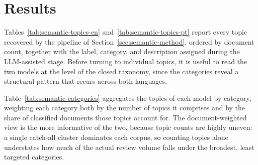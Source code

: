 
\section{Results}
\label{sec:semantic-results}

Tables~\ref{tab:semantic-topics-en} and~\ref{tab:semantic-topics-pt} report every topic recovered by the pipeline of Section~\ref{sec:semantic-method}, ordered by document count, together with the label, category, and description assigned during the LLM-assisted stage. Before turning to individual topics, it is useful to read the two models at the level of the closed taxonomy, since the categories reveal a structural pattern that recurs across both languages.

Table~\ref{tab:semantic-categories} aggregates the topics of each model by category, weighting each category both by the number of topics it comprises and by the share of classified documents those topics account for. The document-weighted view is the more informative of the two, because topic counts are highly uneven: a single catch-all cluster dominates each corpus, so counting topics alone understates how much of the actual review volume falls under the broadest, least targeted categories.

